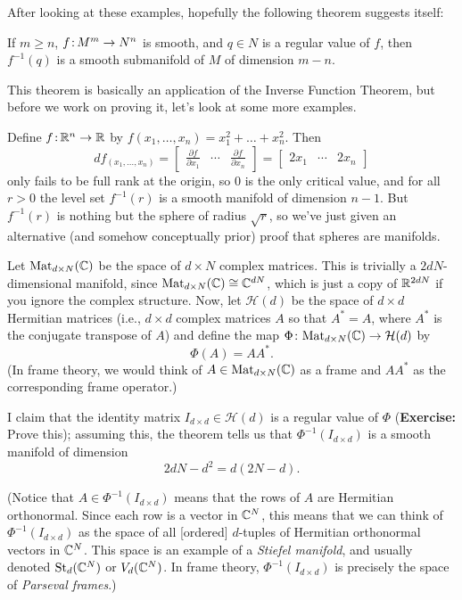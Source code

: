 	After looking at these examples, hopefully the following theorem suggests itself:
	
	\begin{theorem}\label{thm:level set theorem}
		If $m \geq n$, $f \colon\thinspace\!\! M^m \to N^n$ is smooth, and $q \in N$ is a regular value of $f$, then $f^{-1}(q)$ is a smooth submanifold of $M$ of dimension $m-n$.
	\end{theorem}
	
	This theorem is basically an application of the Inverse Function Theorem, but before we work on proving it, let's look at some more examples.
	
	\begin{example}
		Define $f \colon\thinspace\!\! \mathbb{R}^n \to \mathbb{R}$ by $f(x_1,\dots , x_n) = x_1^2 + \dots + x_n^2$. Then
		\[
			df_{(x_1, \dots , x_n)}= \begin{bmatrix} \frac{\partial f}{\partial x_1} & \cdots & \frac{\partial f}{\partial x_n} \end{bmatrix} = \begin{bmatrix} 2x_1 & \cdots & 2x_n \end{bmatrix}
		\]
		only fails to be full rank at the origin, so 0 is the only critical value, and for all $r > 0$ the level set $f^{-1}(r)$ is a smooth manifold of dimension $n-1$. But $f^{-1}(r)$ is nothing but the sphere of radius $\sqrt{r}$, so we've just given an alternative (and somehow conceptually prior) proof that spheres are manifolds.
	\end{example}
	
	\begin{example}
		Let $\operatorname{Mat}_{d \times N}(\mathbb{C})$ be the space of $d \times N$ complex matrices. This is trivially a $2dN$-dimensional manifold, since $\operatorname{Mat}_{d \times N} (\mathbb{C}) \cong \mathbb{C}^{dN}$, which is just a copy of $\mathbb{R}^{2dN}$ if you ignore the complex structure. Now, let $\mathcal{H}(d)$ be the space of $d \times d$ Hermitian matrices (i.e., $d \times d$ complex matrices $A$ so that $A^\ast = A$, where $A^\ast$ is the conjugate transpose of $A$) and define the map $\Phi\colon\thinspace\!\! \operatorname{Mat}_{d \times N}(\mathbb{C}) \to \mathcal{H}(d)$ by
		\[
			\Phi(A) = A A^\ast.
		\]
		(In frame theory, we would think of $A \in \operatorname{Mat}_{d \times N}(\mathbb{C})$ as a frame and $A A^\ast$ as the corresponding frame operator.)
		
		I claim that the identity matrix $I_{d \times d} \in \mathcal{H}(d)$ is a regular value of $\Phi$ (\textbf{Exercise:} Prove this); assuming this, the theorem tells us that $\Phi^{-1}(I_{d \times d})$ is a smooth manifold of dimension
		\[
			2dN - d^2 = d(2N-d).
		\]
		
		(Notice that $A \in \Phi^{-1}(I_{d \times d})$ means that the rows of $A$ are Hermitian orthonormal. Since each row is a vector in $\mathbb{C}^N$, this means that we can think of $\Phi^{-1}(I_{d \times d})$ as the space of all [ordered] $d$-tuples of Hermitian orthonormal vectors in $\mathbb{C}^N$. This space is an example of a \emph{Stiefel manifold}, and usually denoted $\operatorname{St}_d(\mathbb{C}^N)$ or $V_d(\mathbb{C}^N)$. In frame theory, $\Phi^{-1}(I_{d \times d})$ is precisely the space of \emph{Parseval frames}.)
	\end{example}
	
